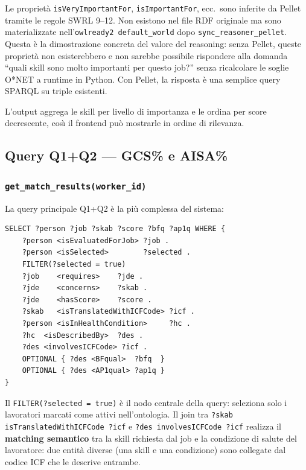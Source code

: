 \documentclass[a4paper,12pt]{article}
\begin{document}
\noindent Le propriet\`{a} \texttt{isVeryImportantFor}, \texttt{isImportantFor},
ecc.\ sono inferite da Pellet tramite le regole SWRL 9--12. Non esistono
nel file RDF originale ma sono materializzate nell'\texttt{owlready2
default\_world} dopo \texttt{sync\_reasoner\_pellet}. Questa \`{e} la
dimostrazione concreta del valore del reasoning: senza Pellet, queste
propriet\`{a} non esisterebbero e non sarebbe possibile rispondere alla
domanda ``quali skill sono molto importanti per questo job?'' senza
ricalcolare le soglie O*NET a runtime in Python. Con Pellet, la risposta
\`{e} una semplice query SPARQL su triple esistenti.

L'output aggrega le skill per livello di importanza e le ordina per score
decrescente, cos\`{\i} il frontend pu\`{o} mostrarle in ordine di rilevanza.

\subsection{Query Q1+Q2 --- GCS\% e AISA\%}

\subsubsection{\texttt{get\_\allowbreak{}match\_\allowbreak{}results(worker\_\allowbreak{}id)}}

La query principale Q1+Q2 \`{e} la pi\`{u} complessa del sistema:

\begin{lstlisting}[caption={SPARQL principale per GCS\% e AISA\% (Q1+Q2).}]
SELECT ?person ?job ?skab ?score ?bfq ?ap1q WHERE {
    ?person <isEvaluatedForJob> ?job .
    ?person <isSelected>        ?selected .
    FILTER(?selected = true)
    ?job    <requires>    ?jde .
    ?jde    <concerns>    ?skab .
    ?jde    <hasScore>    ?score .
    ?skab   <isTranslatedWithICFCode> ?icf .
    ?person <isInHealthCondition>     ?hc .
    ?hc  <isDescribedBy>  ?des .
    ?des <involvesICFCode> ?icf .
    OPTIONAL { ?des <BFqual>  ?bfq  }
    OPTIONAL { ?des <AP1qual> ?ap1q }
}
\end{lstlisting}

\noindent Il \texttt{FILTER(?selected = true)} \`{e} il nodo centrale della query:
seleziona solo i lavoratori marcati come attivi nell'ontologia.
Il join tra \texttt{?skab isTranslatedWithICFCode ?icf} e
\texttt{?des involvesICFCode ?icf} realizza il \textbf{matching semantico}
tra la skill richiesta dal job e la condizione di salute del lavoratore:
due entit\`{a} diverse (una skill e una condizione) sono collegate dal
codice ICF che le descrive entrambe.
\end{document}
